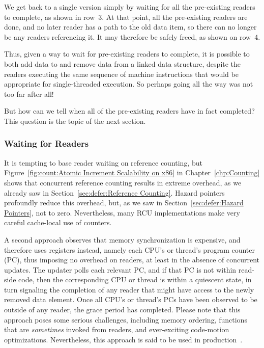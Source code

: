 We get back to a single version simply by waiting for all the
pre-existing readers to complete, as shown in row~3.
At that point, all the pre-existing readers are done, and no later
reader has a path to the old data item, so there can no longer be
any readers referencing it.
It may therefore be safely freed, as shown on row~4.

Thus, given a way to wait for pre-existing readers to complete,
it is possible to both add data to and remove data from a linked
data structure, despite the readers executing the same sequence
of machine instructions that would be appropriate for single-threaded
execution.
So perhaps going all the way was not too far after all!

But how can we tell when all of the pre-existing readers have in
fact completed?
This question is the topic of the next section.

\subsubsection{Waiting for Readers}
\label{sec:defer:Waiting for Readers}

It is tempting to base reader waiting on reference counting, but
Figure~\ref{fig:count:Atomic Increment Scalability on x86}
in
Chapter~\ref{chp:Counting}
shows that concurrent reference counting results in extreme overhead,
as we already saw in
Section~\ref{sec:defer:Reference Counting}.
Hazard pointers profoundly reduce this overhead, but, as we saw in
Section~\ref{sec:defer:Hazard Pointers}, not to zero.
Nevertheless, many RCU implementations make very careful cache-local
use of counters.

A second approach observes that memory synchronization is expensive,
and therefore uses registers instead, namely each CPU's or thread's
program counter (PC), thus imposing no overhead on readers, at least
in the absence of concurrent updates.
The updater polls each relevant PC, and if that PC is not within read-side
code, then the corresponding CPU or thread is within a quiescent state,
in turn signaling the completion of any reader that might have access
to the newly removed data element.
Once all CPU's or thread's PCs have been observed to be outside of any
reader, the grace period has completed.
Please note that this approach poses some serious challenges, including
memory ordering, functions that are \emph{sometimes} invoked from readers,
and ever-exciting code-motion optimizations.
Nevertheless, this approach is said to be used in
production~\cite{MikeAsh2015Apple}.

